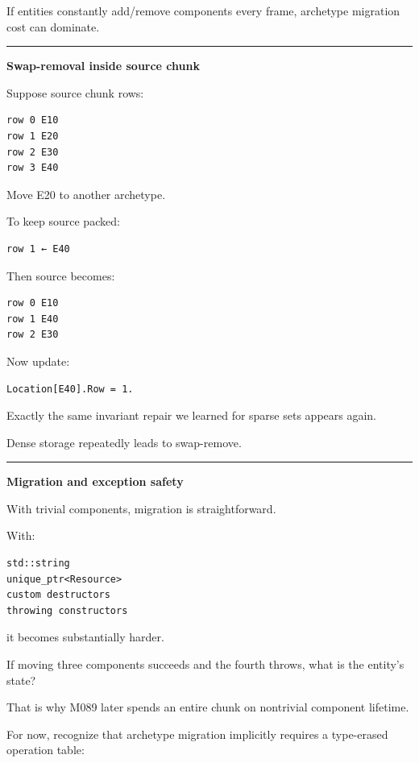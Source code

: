 If entities constantly add/remove components every frame, archetype migration cost can dominate.

\begin{center}\rule{0.5\linewidth}{0.5pt}\end{center}

\textbf{Swap-removal inside source chunk}

Suppose source chunk rows:

\begin{verbatim}
row 0 E10
row 1 E20
row 2 E30
row 3 E40
\end{verbatim}

Move E20 to another archetype.

To keep source packed:

\begin{verbatim}
row 1 ← E40
\end{verbatim}

Then source becomes:

\begin{verbatim}
row 0 E10
row 1 E40
row 2 E30
\end{verbatim}

Now update:

\begin{verbatim}
Location[E40].Row = 1.
\end{verbatim}

Exactly the same invariant repair we learned for sparse sets appears again.

Dense storage repeatedly leads to swap-remove.

\begin{center}\rule{0.5\linewidth}{0.5pt}\end{center}

\textbf{Migration and exception safety}

With trivial components, migration is straightforward.

With:

\begin{verbatim}
std::string
unique_ptr<Resource>
custom destructors
throwing constructors
\end{verbatim}

it becomes substantially harder.

If moving three components succeeds and the fourth throws, what is the entity's state?

That is why M089 later spends an entire chunk on nontrivial component lifetime.

For now, recognize that archetype migration implicitly requires a type-erased operation table:

